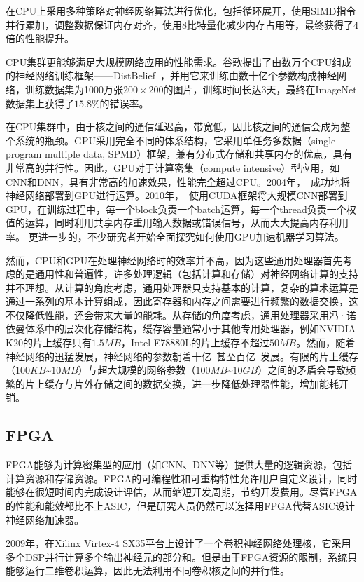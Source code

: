 \citet{vanhoucke2011improving}在CPU上采用多种策略对神经网络算法进行优化，包括循环展开，使用SIMD指令并行累加，调整数据保证内存对齐，使用8比特量化减少内存占用等，最终获得了4倍的性能提升。

CPU集群更能够满足大规模网络应用的性能需求。谷歌提出了由数万个CPU组成的神经网络训练框架——DistBelief~\cite{dean2012large}，并用它来训练由数十亿个参数构成神经网络，训练数据集为1000万张$200\times 200$的图片，训练时间长达3天，最终在ImageNet数据集上获得了$15.8\%$的错误率。

在CPU集群中，由于核之间的通信延迟高，带宽低，因此核之间的通信会成为整个系统的瓶颈。GPU采用完全不同的体系结构，它采用单任务多数据（single program multiple data, SPMD）框架，兼有分布式存储和共享内存的优点，具有非常高的并行性。因此，GPU对于计算密集（compute intensive）型应用，如CNN和DNN，具有非常高的加速效果，性能完全超过CPU。2004年，~\citet{oh2004gpu}成功地将神经网络部署到GPU进行运算。2010年，~\citet{scherer2010accelerating}使用CUDA框架将大规模CNN部署到GPU，在训练过程中，每一个block负责一个batch运算，每一个thread负责一个权值的运算，同时利用共享内存重用输入数据或错误信号，从而大大提高内存利用率。
更进一步的，不少研究者开始全面探究如何使用GPU加速机器学习算法。

然而，CPU和GPU在处理神经网络时的效率并不高，因为这些通用处理器首先考虑的是通用性和普遍性，许多处理逻辑（包括计算和存储）对神经网络计算的支持并不理想。从计算的角度考虑，通用处理器只支持基本的计算，复杂的算术运算是通过一系列的基本计算组成，因此寄存器和内存之间需要进行频繁的数据交换，这不仅降低性能，还会带来大量的能耗。从存储的角度考虑，通用处理器采用冯·诺依曼体系中的层次化存储结构，缓存容量通常小于其他专用处理器，例如NVIDIA K20的片上缓存只有$1.5MB$，Intel E78880L的片上缓存不超过$50MB$。然而，随着神经网络的迅猛发展，神经网络的参数朝着十亿~\cite{le2013building}甚至百亿~\cite{coates2013deep}发展。有限的片上缓存（$100KB$\~{}$10MB$）与超大规模的网络参数（$100MB$\~{}$10GB$）之间的矛盾会导致频繁的片上缓存与片外存储之间的数据交换，进一步降低处理器性能，增加能耗开销。

\subsection{FPGA}
FPGA能够为计算密集型的应用（如CNN、DNN等）提供大量的逻辑资源，包括计算资源和存储资源。FPGA的可编程性和可重构特性允许用户自定义设计，同时能够在很短时间内完成设计评估，从而缩短开发周期，节约开发费用。尽管FPGA的性能和能效都比不上ASIC，但是研究人员仍然可以选择用FPGA代替ASIC设计神经网络加速器。

2009年，\citet{farabet2009cnp}在Xilinx Virtex-4 SX35平台上设计了一个卷积神经网络处理核，它采用多个DSP并行计算多个输出神经元的部分和。但是由于FPGA资源的限制，系统只能够运行二维卷积运算，因此无法利用不同卷积核之间的并行性。

